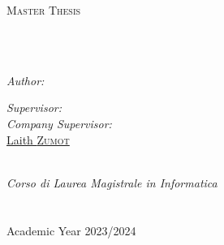 \documentclass[
11pt, %
english, %
singlespacing, %
headsepline, %
]{MastersDoctoralThesis} %
\begin{document}
\begin{titlepage}
\begin{center}
{\scshape\LARGE \univname\par}\vspace{1.5cm} %
\textsc{\Large Master Thesis}\\[0.5cm] %
\HRule \\[0.4cm] %
{\huge \bfseries \ttitle\par}\vspace{0.4cm} %
\HRule \\[1.5cm] %
\begin{minipage}[t]{0.4\textwidth}
\begin{flushleft} \large
\emph{Author:}\\
\href{https://github.com/lhamu}{\authorname} %
\end{flushleft}
\end{minipage}
\begin{minipage}[t]{0.4\textwidth}
\begin{flushright} \large
\emph{Supervisor:} \\
\href{https://www.disim.univaq.it/ThanhPhuong}{\supname} %
\emph{Company Supervisor:} \\
\href{mailto:laith.zumot@nokia.com}{Laith \textsc{Zumot}} %
\end{flushright}
\end{minipage}\\[3cm]
\vfill
\large \textit{Corso di Laurea Magistrale in Informatica}\\[0.3cm] %
\textit{}\\[0.4cm]
\deptname\\[0.5cm] %
\vfill
{\large Academic Year 2023/2024}\\[2cm] %
\vfill
\end{center}
\end{titlepage}

\end{document}
